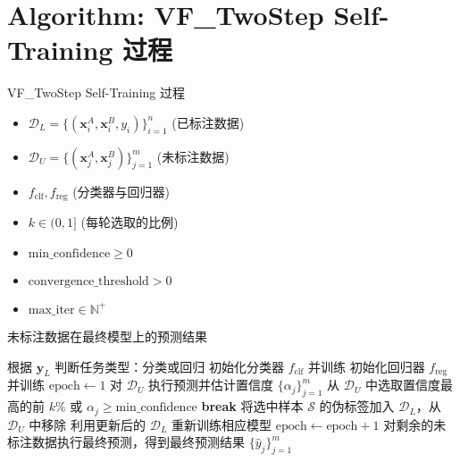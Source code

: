 \documentclass[12pt]{article}
\begin{document}
	
	\section*{Algorithm: VF\_TwoStep Self-Training 过程}
	
	\begin{algorithm}[H]
		\caption{VF\_TwoStep Self-Training 过程}
		\begin{algorithmic}[1]
			\REQUIRE 
			\begin{itemize}
				\item $\mathcal{D}_L = \{(\mathbf{x}_i^A, \mathbf{x}_i^B, y_i)\}_{i=1}^n$ \quad (已标注数据)
				\item $\mathcal{D}_U = \{(\mathbf{x}_j^A, \mathbf{x}_j^B)\}_{j=1}^m$ \quad (未标注数据)
				\item $f_\text{clf}, f_\text{reg}$ \quad (分类器与回归器)
				\item $k \in (0,1]$ \quad (每轮选取的比例)
				\item $\text{min\_confidence} \ge 0$
				\item $\text{convergence\_threshold} > 0$
				\item $\text{max\_iter} \in \mathbb{N}^+$
			\end{itemize}
			\ENSURE 未标注数据在最终模型上的预测结果
			
			\STATE 根据 $\mathbf{y}_L$ 判断任务类型：分类或回归
			\STATE 初始化分类器 $f_\text{clf}$ 并训练
			\ELSE
			\STATE 初始化回归器 $f_\text{reg}$ 并训练
			\ENDIF
			\STATE $\text{epoch} \leftarrow 1$
			\STATE 对 $\mathcal{D}_U$ 执行预测并估计置信度 $\{\alpha_j\}_{j=1}^m$
			\STATE 从 $\mathcal{D}_U$ 中选取置信度最高的前 $k\%$ 或 $\alpha_j \ge \text{min\_confidence}$
			\STATE \textbf{break}
			\ENDIF
			\STATE 将选中样本 $\mathcal{S}$ 的伪标签加入 $\mathcal{D}_L$，从 $\mathcal{D}_U$ 中移除
			\STATE 利用更新后的 $\mathcal{D}_L$ 重新训练相应模型
			\STATE $\text{epoch} \leftarrow \text{epoch} + 1$
			\ENDWHILE
			\STATE 对剩余的未标注数据执行最终预测，得到最终预测结果
			\RETURN $\{\hat{y}_j\}_{j=1}^m$
		\end{algorithmic}
	\end{algorithm}
	
\end{document}
